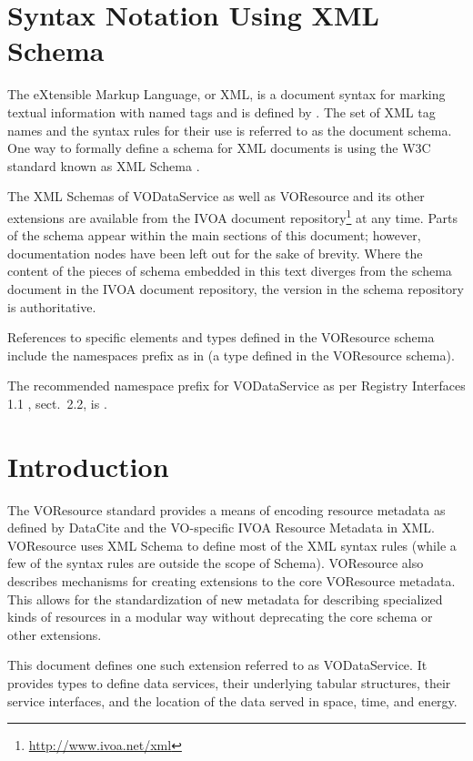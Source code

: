 \documentclass[11pt,a4paper]{ivoa}
\begin{document}
\section*{Syntax Notation Using XML Schema}

The eXtensible Markup Language, or XML, is a document syntax for marking
textual information with named tags and is defined by \citet{std:XML}.
The set of XML tag names and the syntax
rules for their use is referred to as the document schema.  One way to
formally define a schema for XML documents is using the W3C standard
known as XML Schema \citep{std:XSD}.

The XML Schemas of VODataService as well as VOResource and its other
extensions are
available from the IVOA document
repository\footnote{\url{http://www.ivoa.net/xml}} at any time.
Parts of the schema appear within the main sections of this document;
however, documentation nodes have been left out for the sake of brevity.
Where the content of the pieces of schema embedded in this text
diverges from the schema document in the IVOA document
repository, the version in the schema repository is authoritative.

References to specific elements and types defined in the VOResource
schema include the namespaces prefix  as in
 (a type defined in the VOResource schema).

The
recommended namespace prefix for VODataService as per Registry
Interfaces 1.1 \citep{2018ivoa.spec.0723D}, sect.~2.2, is .

\section{Introduction}

The VOResource standard \citep{2018ivoa.spec.0625P} provides a means of
encoding resource metadata as defined by DataCite \citep{std:DataCite40}
and the VO-specific IVOA Resource Metadata \citep{2007ivoa.spec.0302H} in XML.
VOResource uses XML Schema \citep{std:XSD} to define
most of the XML syntax rules (while a few of the syntax rules are
outside the scope of Schema).  VOResource also describes mechanisms
for creating extensions to the core VOResource metadata.  This allows
for the standardization of new metadata for describing specialized
kinds of resources in a modular way without deprecating the core
schema or other extensions.  

This document defines one such extension referred to as VODataService.
It provides types to define data services, their underlying tabular
structures, their service interfaces, and the location of the data
served in space, time, and energy.
\end{document}

